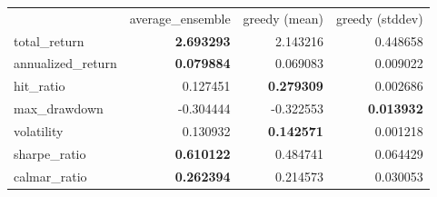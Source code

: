 \begin{tabular}{lrrr}
 & average_ensemble & greedy (mean) & greedy (stddev) \\
total_return & \bfseries 2.693293 & 2.143216 & 0.448658 \\
annualized_return & \bfseries 0.079884 & 0.069083 & 0.009022 \\
hit_ratio & 0.127451 & \bfseries 0.279309 & 0.002686 \\
max_drawdown & -0.304444 & -0.322553 & \bfseries 0.013932 \\
volatility & 0.130932 & \bfseries 0.142571 & 0.001218 \\
sharpe_ratio & \bfseries 0.610122 & 0.484741 & 0.064429 \\
calmar_ratio & \bfseries 0.262394 & 0.214573 & 0.030053 \\
\end{tabular}
